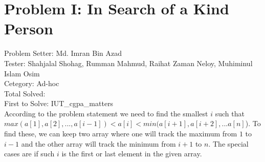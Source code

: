 \section*{Problem I: In Search of a Kind Person}
Problem Setter: Md. Imran Bin Azad \\
Tester: Shahjalal Shohag, Rumman Mahmud, Raihat Zaman Neloy, Muhiminul Islam Osim \\
Cetegory: Ad-hoc \\
Total Solved:  \\
First to Solve: IUT\_cgpa\_matters\\

According to the problem statement we need to find the smallest $i$ such that
$max(a[1], a[2], ... , a[i-1]) < a[i] < min(a[i+1], a[i+2], ... a[n]$). To find
these, we can keep two array where one will track the maximum from $1$ to $i-1$
and the other array will track the minimum from $i+1$ to $n$. The special cases
are if such $i$ is the first or last element in the given array.